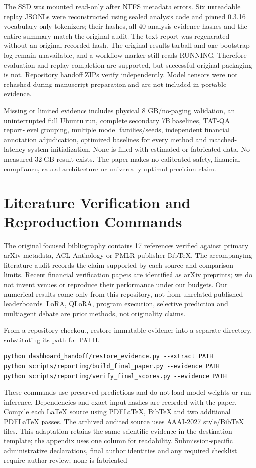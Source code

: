 \documentclass[10pt]{article}
\begin{document}
The SSD was mounted read-only after NTFS metadata errors. Six unreadable replay JSONLs were reconstructed using sealed analysis code and pinned 0.3.16 vocabulary-only tokenizers; their hashes, all 40 analysis-evidence hashes and the entire summary match the original audit. The text report was regenerated without an original recorded hash. The original results tarball and one bootstrap log remain unavailable, and a workflow marker still reads RUNNING. Therefore evaluation and replay completion are supported, but successful original packaging is not. Repository handoff ZIPs verify independently. Model tensors were not rehashed during manuscript preparation and are not included in portable evidence.

Missing or limited evidence includes physical 8 GB/no-paging validation, an uninterrupted full Ubuntu run, complete secondary 7B baselines, TAT-QA report-level grouping, multiple model families/seeds, independent financial annotation adjudication, optimized baselines for every method and matched-latency system initialization. None is filled with estimated or fabricated data. No measured 32 GB result exists. The paper makes no calibrated safety, financial compliance, causal architecture or universally optimal precision claim.

\section{Literature Verification and Reproduction Commands}
The original focused bibliography contains 17 references verified against primary arXiv metadata, ACL Anthology or PMLR publisher BibTeX. The accompanying literature audit records the claim supported by each source and comparison limits. Recent financial verification papers are identified as arXiv preprints; we do not invent venues or reproduce their performance under our budgets. Our numerical results come only from this repository, not from unrelated published leaderboards. LoRA, QLoRA, program execution, selective prediction and multiagent debate are prior methods, not originality claims.

From a repository checkout, restore immutable evidence into a separate directory, substituting its path for PATH:

\noindent\begin{minipage}{\textwidth}
\begin{verbatim}
python dashboard_handoff/restore_evidence.py --extract PATH
python scripts/reporting/build_final_paper.py --evidence PATH
python scripts/reporting/verify_final_scores.py --evidence PATH
\end{verbatim}
\end{minipage}
These commands use preserved predictions and do not load model weights or run inference. Dependencies and exact input hashes are recorded with the paper. Compile each LaTeX source using PDFLaTeX, BibTeX and two additional PDFLaTeX passes. The archived audited source uses AAAI-2027 style/BibTeX files. This adaptation retains the same scientific evidence in the destination template; the appendix uses one column for readability. Submission-specific administrative declarations, final author identities and any required checklist require author review; none is fabricated.
\end{document}
